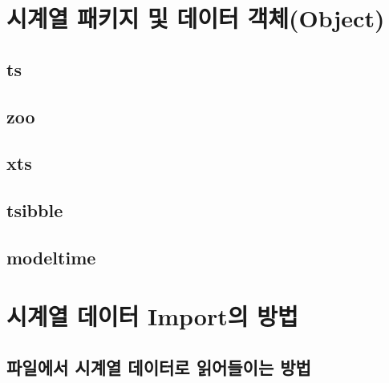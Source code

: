 \documentclass[
]{book}
\begin{document}
\hypertarget{uxc2dcuxacc4uxc5f4-uxd328uxd0a4uxc9c0-uxbc0f-uxb370uxc774uxd130-uxac1duxccb4object}{%
\section{시계열 패키지 및 데이터 객체(Object)}\label{uxc2dcuxacc4uxc5f4-uxd328uxd0a4uxc9c0-uxbc0f-uxb370uxc774uxd130-uxac1duxccb4object}}

\hypertarget{ts}{%
\subsection{ts}\label{ts}}

\hypertarget{zoo}{%
\subsection{zoo}\label{zoo}}

\hypertarget{xts}{%
\subsection{xts}\label{xts}}

\hypertarget{tsibble}{%
\subsection{tsibble}\label{tsibble}}

\hypertarget{modeltime}{%
\subsection{modeltime}\label{modeltime}}

\hypertarget{uxc2dcuxacc4uxc5f4-uxb370uxc774uxd130-importuxc758-uxbc29uxbc95}{%
\section{시계열 데이터 Import의 방법}\label{uxc2dcuxacc4uxc5f4-uxb370uxc774uxd130-importuxc758-uxbc29uxbc95}}

\hypertarget{uxd30cuxc77cuxc5d0uxc11c-uxc2dcuxacc4uxc5f4-uxb370uxc774uxd130uxb85c-uxc77duxc5b4uxb4e4uxc774uxb294-uxbc29uxbc95}{%
\subsection{파일에서 시계열 데이터로 읽어들이는 방법}\label{uxd30cuxc77cuxc5d0uxc11c-uxc2dcuxacc4uxc5f4-uxb370uxc774uxd130uxb85c-uxc77duxc5b4uxb4e4uxc774uxb294-uxbc29uxbc95}}
\end{document}
